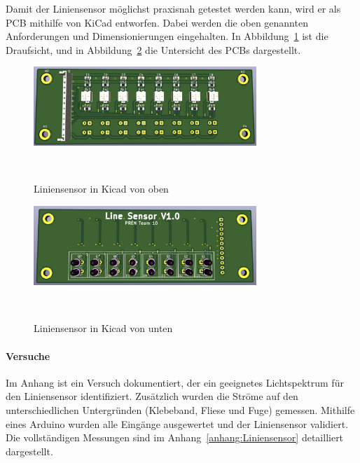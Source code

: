 \documentclass[main.tex]{subfiles} %
\begin{document}
Damit der Liniensensor möglichst praxisnah getestet werden kann, wird er als 
PCB mithilfe von KiCad entworfen. Dabei werden die oben genannten Anforderungen 
und Dimensionierungen eingehalten. In Abbildung~\ref{fig:Liniensensor_Top} 
ist die Draufsicht, und in Abbildung~\ref{fig:Liniensensor_Bottom} die 
Untersicht des PCBs dargestellt.

\begin{figure}[H]
    \centering
    \includegraphics[width=0.75\textwidth]{fig_Strecke_Tracken/Liniensensor_Top.pdf}
    \caption{Liniensensor in Kicad von oben}~\label{fig:Liniensensor_Top}
\end{figure}

\begin{figure}[H]
    \centering
    \includegraphics[width=0.75\textwidth]{fig_Strecke_Tracken/Liniensensor_Bottom.pdf}
    \caption{Liniensensor in Kicad von unten}~\label{fig:Liniensensor_Bottom}
\end{figure}


\paragraph{Versuche}  
Im Anhang ist ein Versuch dokumentiert, der ein geeignetes Lichtspektrum für 
den Liniensensor identifiziert. Zusätzlich wurden die Ströme auf den 
unterschiedlichen Untergründen (Klebeband, Fliese und Fuge) gemessen. Mithilfe 
eines Arduino wurden alle Eingänge ausgewertet und der Liniensensor validiert. 
Die vollständigen Messungen sind im Anhang~\ref{anhang:Liniensensor} 
detailliert dargestellt.

\end{document}
